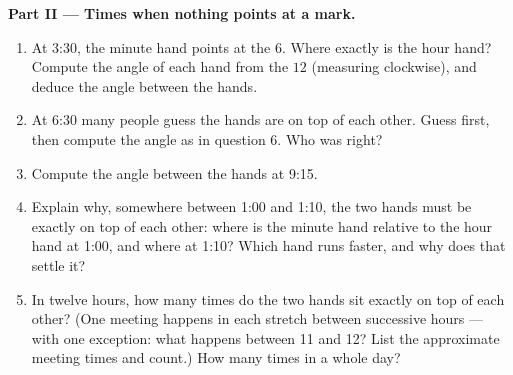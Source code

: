 \begin{problem}
\medskip
\noindent\textbf{Part II --- Times when nothing points at a
mark.}
\begin{enumerate}[resume]
  \item At 3:30, the minute hand points at the $6$. Where exactly
        is the hour hand? Compute the angle of each hand from the
        $12$ (measuring clockwise), and deduce the angle between
        the hands.
  \item At 6:30 many people guess the hands are on top of each
        other. Guess first, then compute the angle as in question
        6. Who was right?
  \item Compute the angle between the hands at 9:15.
  \item Explain why, somewhere between 1:00 and 1:10, the two
        hands must be exactly on top of each other: where is the
        minute hand relative to the hour hand at 1:00, and where
        at 1:10? Which hand runs faster, and why does that settle
        it?
  \item In twelve hours, how many times do the two hands sit
        exactly on top of each other? (One meeting happens in
        each stretch between successive hours --- with one
        exception: what happens between 11 and 12? List the
        approximate meeting times and count.) How many times in a
        whole day?
\end{enumerate}


\end{problem}
